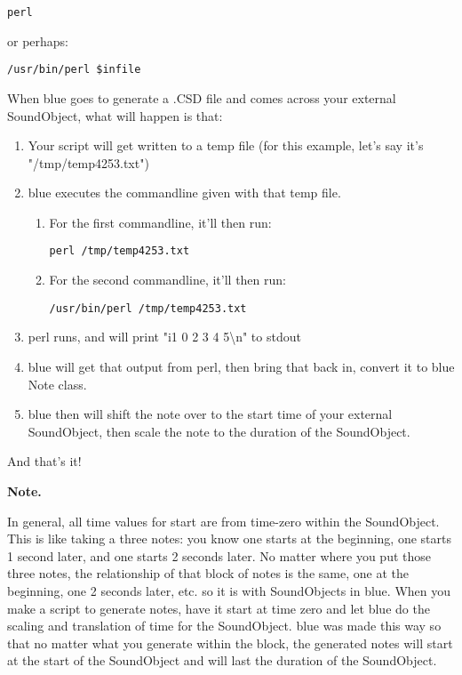 \begin{verbatim}
perl
\end{verbatim}

or perhaps:

\begin{verbatim}
/usr/bin/perl $infile
\end{verbatim}

When blue goes to generate a .CSD file and comes across your external
SoundObject, what will happen is that:

\begin{enumerate}
\def\labelenumi{\arabic{enumi}.}
\item
  Your script will get written to a temp file (for this example, let's
  say it's "/tmp/temp4253.txt")
\item
  blue executes the commandline given with that temp file.

  \begin{enumerate}
  \def\labelenumii{\arabic{enumii}.}
  \item
    For the first commandline, it'll then run:

\begin{verbatim}
perl /tmp/temp4253.txt
\end{verbatim}
  \item
    For the second commandline, it'll then run:

\begin{verbatim}
/usr/bin/perl /tmp/temp4253.txt
\end{verbatim}
  \end{enumerate}
\item
  perl runs, and will print "i1 0 2 3 4 5\textbackslash{}n" to stdout
\item
  blue will get that output from perl, then bring that back in, convert
  it to blue Note class.
\item
  blue then will shift the note over to the start time of your external
  SoundObject, then scale the note to the duration of the SoundObject.
\end{enumerate}

And that's it!

\textbf{Note.}

In general, all time values for start are from time-zero within the
SoundObject. This is like taking a three notes: you know one starts at
the beginning, one starts 1 second later, and one starts 2 seconds
later. No matter where you put those three notes, the relationship of
that block of notes is the same, one at the beginning, one 2 seconds
later, etc. so it is with SoundObjects in blue. When you make a script
to generate notes, have it start at time zero and let blue do the
scaling and translation of time for the SoundObject. blue was made this
way so that no matter what you generate within the block, the generated
notes will start at the start of the SoundObject and will last the
duration of the SoundObject.

